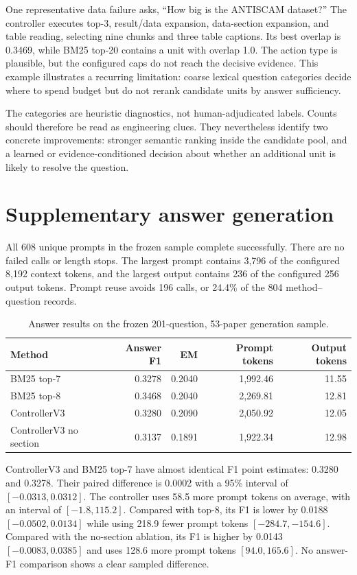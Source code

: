 One representative data failure asks, ``How big is the ANTISCAM dataset?'' The controller executes top-3, result/data expansion, data-section expansion, and table reading, selecting nine chunks and three table captions. Its best overlap is 0.3469, while BM25 top-20 contains a unit with overlap 1.0. The action type is plausible, but the configured caps do not reach the decisive evidence. This example illustrates a recurring limitation: coarse lexical question categories decide where to spend budget but do not rerank candidate units by answer sufficiency.

The categories are heuristic diagnostics, not human-adjudicated labels. Counts should therefore be read as engineering clues. They nevertheless identify two concrete improvements: stronger semantic ranking inside the candidate pool, and a learned or evidence-conditioned decision about whether an additional unit is likely to resolve the question.

\section{Supplementary answer generation}

All 608 unique prompts in the frozen sample complete successfully. There are no failed calls or length stops. The largest prompt contains 3,796 of the configured 8,192 context tokens, and the largest output contains 236 of the configured 256 output tokens. Prompt reuse avoids 196 calls, or 24.4\% of the 804 method--question records.

\begin{table}[tb]
\centering
\caption{Answer results on the frozen 201-question, 53-paper generation sample.}
\label{tab:generation}
\small
\begin{tabular}{@{}lrrrr@{}}
\toprule
Method & Answer F1 & EM & Prompt tokens & Output tokens \\
\midrule
BM25 top-7 & 0.3278 & 0.2040 & 1,992.46 & 11.55 \\
BM25 top-8 & 0.3468 & 0.2040 & 2,269.81 & 12.81 \\
ControllerV3 & 0.3280 & 0.2090 & 2,050.92 & 12.05 \\
ControllerV3 no section & 0.3137 & 0.1891 & 1,922.34 & 12.98 \\
\bottomrule
\end{tabular}
\end{table}

ControllerV3 and BM25 top-7 have almost identical F1 point estimates: 0.3280 and 0.3278. Their paired difference is 0.0002 with a 95\% interval of $[-0.0313,0.0312]$. The controller uses 58.5 more prompt tokens on average, with an interval of $[-1.8,115.2]$. Compared with top-8, its F1 is lower by 0.0188 $[-0.0502,0.0134]$ while using 218.9 fewer prompt tokens $[-284.7,-154.6]$. Compared with the no-section ablation, its F1 is higher by 0.0143 $[-0.0083,0.0385]$ and uses 128.6 more prompt tokens $[94.0,165.6]$. No answer-F1 comparison shows a clear sampled difference.

